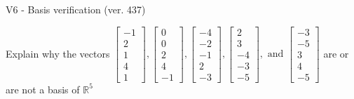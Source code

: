\begin{exercise}
  \begin{exerciseTitle}V6 - Basis verification (ver. 437)\end{exerciseTitle}
  \begin{exerciseStatement}
    Explain why the vectors \(\left[\begin{array}{r}
-1 \\
2 \\
1 \\
4 \\
1
\end{array}\right] , \left[\begin{array}{r}
0 \\
0 \\
2 \\
4 \\
-1
\end{array}\right] , \left[\begin{array}{r}
-4 \\
-2 \\
-1 \\
2 \\
-3
\end{array}\right] , \left[\begin{array}{r}
2 \\
3 \\
-4 \\
-3 \\
-5
\end{array}\right] , \text{ and } \left[\begin{array}{r}
-3 \\
-5 \\
3 \\
4 \\
-5
\end{array}\right]\) are or are not a basis of \(\mathbb{R}^5\)	



\end{exerciseStatement}
\end{exercise}
